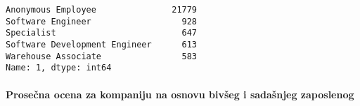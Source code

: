 \documentclass[11pt]{article}
\makeatletter
\newcommand{\boxspacing}{\kern\kvtcb@left@rule\kern\kvtcb@boxsep}
\newcommand{\prompt}[4]{
        \ttfamily\llap{{\color{#2}[#3]:\hspace{3pt}#4}}\vspace{-\baselineskip}
    }
\makeatother
\begin{document}
            \begin{tcolorbox}[breakable, size=fbox, boxrule=.5pt, pad at break*=1mm, opacityfill=0]
\prompt{Out}{outcolor}{242}{\boxspacing}
\begin{Verbatim}[commandchars=\\\{\}]
Anonymous Employee               21779
Software Engineer                  928
Specialist                         647
Software Development Engineer      613
Warehouse Associate                583
Name: 1, dtype: int64
\end{Verbatim}
\end{tcolorbox}
        
    \hypertarget{proseux10dna-ocena-za-kompaniju-na-osnovu-bivux161eg-i-sadaux161njeg-zaposlenog}{%
\paragraph{Prosečna ocena za kompaniju na osnovu bivšeg i sadašnjeg
zaposlenog
}\label{proseux10dna-ocena-za-kompaniju-na-osnovu-bivux161eg-i-sadaux161njeg-zaposlenog}}
\end{document}
